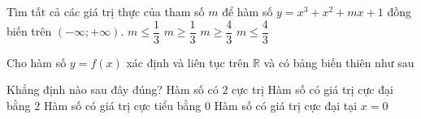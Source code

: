 

\begin{ex}%
	 Tìm tất cả các giá trị thực của tham số $ m$ để hàm số $ y=x^3+x^2+mx+1$ đồng biến trên $\left(-\infty;+\infty \right)$.
	\choice 
		{$  m\le\dfrac13$}
		{\True  $ m\ge\dfrac13$}
		 {$ m\ge\dfrac43$}
		 {$ m\le\dfrac43$}
\end{ex}

\begin{ex}%
	Cho hàm số $y=f(x)$ xác định và liên tục trên $\mathbb{R}$ và có bảng biến  thiên như sau
	\begin{center}
	\end{center}
	Khẳng định nào sau đây  đúng?
	 \choice
		{Hàm số có $2$ cực  trị}
		{Hàm số có giá trị cực đại bằng $2$} 
		{\True Hàm số có giá trị cực tiểu bằng  $0$}
		{Hàm số có giá trị cực đại tại  $x=0$}
\end{ex}

